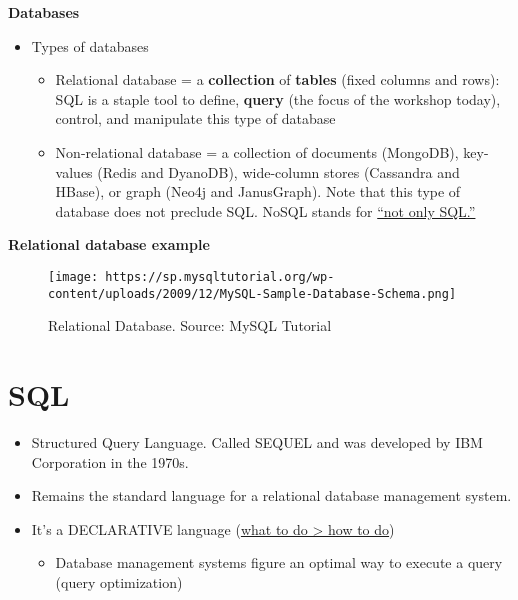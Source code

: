 \documentclass[
]{book}
\providecommand{\tightlist}{%
  \setlength{\itemsep}{0pt}\setlength{\parskip}{0pt}}
\begin{document}
\textbf{Databases}

\begin{itemize}
\tightlist
\item
  Types of databases

  \begin{itemize}
  \tightlist
  \item
    Relational database = a \textbf{collection} of \textbf{tables} (fixed columns and rows): SQL is a staple tool to define, \textbf{query} (the focus of the workshop today), control, and manipulate this type of database
  \item
    Non-relational database = a collection of documents (MongoDB), key-values (Redis and DyanoDB), wide-column stores (Cassandra and HBase), or graph (Neo4j and JanusGraph). Note that this type of database does not preclude SQL. NoSQL stands for \href{https://www.mongodb.com/nosql-explained}{``not only SQL.''}
  \end{itemize}
\end{itemize}

\textbf{Relational database example}

\begin{figure}
\centering
\texttt{[image: https://sp.mysqltutorial.org/wp-content/uploads/2009/12/MySQL-Sample-Database-Schema.png]}
\caption{Relational Database. Source: MySQL Tutorial}
\end{figure}

\hypertarget{sql}{%
\section{SQL}\label{sql}}

\begin{itemize}
\item
  Structured Query Language. Called SEQUEL and was developed by IBM Corporation in the 1970s.
\item
  Remains the standard language for a relational database management system.
\item
  It's a DECLARATIVE language (\href{https://www.sqlite.org/queryplanner.html}{what to do \textgreater{} how to do})

  \begin{itemize}
  \tightlist
  \item
    Database management systems figure an optimal way to execute a query (query optimization)
  \end{itemize}
\end{itemize}
\end{document}
